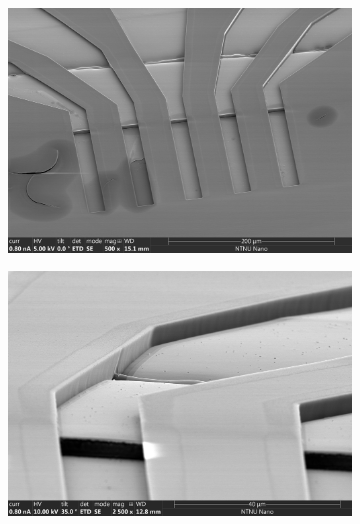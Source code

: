 \begin{figure}[h!]
\centering
\begin{subfigure}{\textwidth}
  \centering
  \includegraphics[width=\linewidth]{fig/mr-DWL/mb_25_overview_002.jpg}
  \label{fig:sfig1}
\end{subfigure}%

\begin{subfigure}{\textwidth}
  \centering
  \includegraphics[width=\linewidth]{fig/mr-DWL/mb_25_step_004.jpg}
  \label{fig:sfig2}
\end{subfigure}%

\caption{}
\label{fig:si_sige}
\end{figure}


